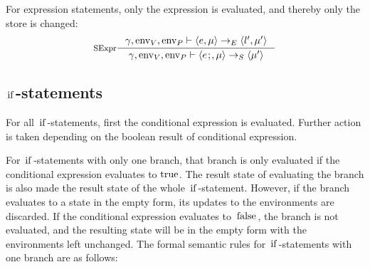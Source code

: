 \documentclass[a4paper, 10pt, draft]{report}
\DeclareMathOperator*{\env}{env}
\newcommand{\mycode}[1]{\ensuremath{\mbox{\lstinline{#1}}}}
\begin{document}
For expression statements, only the expression is evaluated, and thereby only the store is changed:
\[\inference[SExpr]{
  \gamma, \env_V, \env_P |- \left<e, \mu \right> \to_E \left<l', \mu' \right>
}{
  \gamma, \env_V, \env_P |- \left<e\mycode{;}, \mu \right> \to_S \left< \mu' \right>
}\]

\subsection{\mycode{if}-statements}\label{sec:semantics:statements:if}

For all \mycode{if}-statements, first the conditional expression is evaluated.
Further action is taken depending on the boolean result of conditional
expression.

For \mycode{if}-statements with only one branch, that branch is only evaluated
if the conditional expression evaluates to \mycode{true}. The result state of
evaluating the branch is also made the result state of the whole
\mycode{if}-statement. However, if the branch evaluates to a state in the empty
form, its updates to the environments are discarded. If the conditional
expression evaluates to \mycode{false}, the branch is not evaluated, and the
resulting state will be in the empty form with the environments left unchanged.
The formal semantic rules for \mycode{if}-statements with one branch are as
follows:
\end{document}
